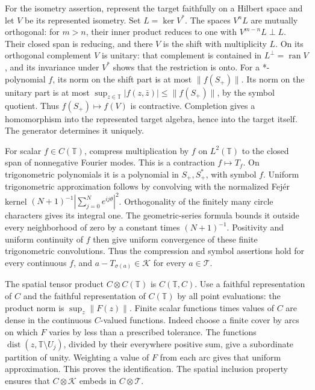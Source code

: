 \documentclass[
  11pt,
]{article}
\begin{document}
For the isometry assertion, represent the target faithfully on a Hilbert
space and let \(V\) be its represented isometry. Set \(L=\ker V^*\). The
spaces \(V^nL\) are mutually orthogonal: for \(m>n\), their inner
product reduces to one with \(V^{m-n}L\perp L\). Their closed span is
reducing, and there \(V\) is the shift with multiplicity \(L\). On its
orthogonal complement \(V\) is unitary: that complement is contained in
\(L^\perp=\operatorname{ran}V\), and its invariance under \(V^*\) shows
that the restriction is onto. For a *-polynomial \(f\), its norm on the
shift part is at most \(\|f(S_+)\|\). Its norm on the unitary part is at
most \(\sup_{z\in\mathbb T}|f(z,\bar z)|\leq\|f(S_+)\|\), by the symbol
quotient. Thus \(f(S_+)\mapsto f(V)\) is contractive. Completion gives a
homomorphism into the represented target algebra, hence into the target
itself. The generator determines it uniquely.

For scalar \(f\in C(\mathbb T)\), compress multiplication by \(f\) on
\(L^2(\mathbb T)\) to the closed span of nonnegative Fourier modes. This
is a contraction \(f\mapsto T_f\). On trigonometric polynomials it is a
polynomial in \(S_+,S_+^*\), with symbol \(f\). Uniform trigonometric
approximation follows by convolving with the normalized Fejér kernel
\((N+1)^{-1}|\sum_{j=0}^N e^{ij\theta}|^2\). Orthogonality of the
finitely many circle characters gives its integral one. The
geometric-series formula bounds it outside every neighborhood of zero by
a constant times \((N+1)^{-1}\). Positivity and uniform continuity of
\(f\) then give uniform convergence of these finite trigonometric
convolutions. Thus the compression and symbol assertions hold for every
continuous \(f\), and \(a-T_{\sigma(a)}\in\mathcal K\) for every
\(a\in\mathcal T\).

The spatial tensor product \(C\otimes C(\mathbb T)\) is
\(C(\mathbb T,C)\). Use a faithful representation of \(C\) and the
faithful representation of \(C(\mathbb T)\) by all point evaluations:
the product norm is \(\sup_z\|F(z)\|\). Finite scalar functions times
values of \(C\) are dense in the continuous \(C\)-valued functions.
Indeed choose a finite cover by arcs on which \(F\) varies by less than
a prescribed tolerance. The functions
\(\operatorname{dist}(z,\mathbb T\setminus U_j)\), divided by their
everywhere positive sum, give a subordinate partition of unity.
Weighting a value of \(F\) from each arc gives that uniform
approximation. This proves the identification. The spatial inclusion
property ensures that \(C\otimes\mathcal K\) embeds in
\(C\otimes\mathcal T\).
\end{document}
